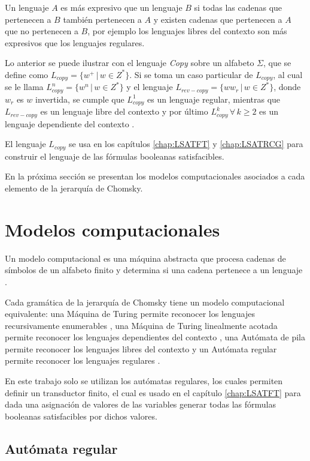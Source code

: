 Un lenguaje $A$ es más expresivo que un lenguaje $B$ si todas las cadenas que pertenecen a $B$ también pertenecen a $A$ y existen cadenas 
que pertenecen a $A$ que no pertenecen a $B$, por ejemplo los lenguajes libres del contexto son más expresivos que los lenguajes regulares. 

Lo anterior se puede ilustrar con el lenguaje \textit{Copy} sobre un alfabeto 
$\Sigma$, que se define como $L_{copy}=\{w^+\,|\,w\in Z^*\}$.  
Si se toma un caso particular de $L_{copy}$, al cual se le llama $L_{copy}^n=\{w^n\,|\,w\in Z^*\}$ y 
el lenguaje $L_{rev-copy}=\{ww_r\,|\,w\in Z^*\}$, donde $w_r$ es $w$ invertida, se cumple que $L_{copy}^1$
es un lenguaje regular, mientras que $L_{rev-copy}$ es un lenguaje libre del contexto y por último 
$L_{copy}^k\,\forall\,k\geq 2$ es un lenguaje dependiente del contexto \cite{authomataTheory}.  

El lenguaje $L_{copy}$ se usa en los  capítulos \ref{chap:LSATFT} y \ref{chap:LSATRCG} para construir el lenguaje de las fórmulas booleanas satisfacibles.

En la próxima sección se presentan los modelos computacionales asociados a cada elemento de la jerarquía de Chomsky.
\section{Modelos computacionales}

Un modelo computacional es una máquina abstracta que procesa cadenas de símbolos de un alfabeto finito y 
determina si una cadena pertenece a un lenguaje \cite{authomataTheory}. 

Cada gramática de la jerarquía de Chomsky tiene un modelo computacional equivalente: una Máquina de Turing 
permite reconocer los lenguajes recursivamente enumerables \cite{authomataTheory}, una Máquina de Turing linealmente acotada permite
reconocer los lenguajes dependientes del contexto \cite{authomataTheory}, una Autómata de pila permite reconocer 
los lenguajes libres del contexto \cite{authomataTheory} y un Autómata regular permite reconocer los lenguajes regulares \cite{authomataTheory}.

En este trabajo solo se utilizan los autómatas regulares, los cuales permiten definir un transductor finito, el cual es 
usado en el capítulo \ref{chap:LSATFT} para dada una asignación de valores de las variables generar todas las fórmulas
booleanas satisfacibles por dichos valores.

\subsection{Autómata regular}

